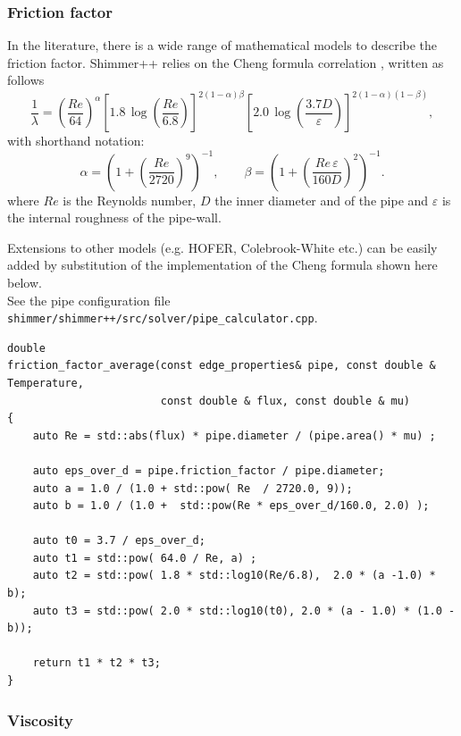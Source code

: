 \subsubsection{Friction factor}

In the literature, there is a wide range of mathematical models to describe the friction factor. Shimmer++ relies on the Cheng formula correlation \cite{CHENG}, written as follows
\begin{equation*}
\label{cheng}
\frac{1}{\lambda} =
\left( \frac{Re}{64} \right)^{\alpha}
\left[ 1.8 \, \log\!\left( \frac{Re}{6.8} \right) \right]^{2(1-\alpha)\beta}
\left[ 2.0 \, \log\!\left( \frac{3.7D}{\varepsilon} \right) \right]^{2(1-\alpha)(1-\beta)},
\end{equation*}
with shorthand notation:
\begin{equation*}
\alpha = \left(1 + \left( \dfrac{Re}{2720} \right)^{9}\right)^{-1},
\qquad
\beta = \left(1 + \left( \dfrac{Re \, \varepsilon}{160 D} \right)^{2}\right)^{-1}.
\label{eq:cheng_ab}
\end{equation*}
where $Re$ is the Reynolds number, $D$ the inner diameter and of the pipe and $\varepsilon$ is the internal roughness of the pipe-wall.

Extensions to other models (e.g. HOFER, Colebrook-White etc.) can be easily added by substitution of the implementation of the Cheng formula shown here below. \\
See the pipe configuration file 
\texttt{shimmer/shimmer++/src/solver/pipe\_calculator.cpp}.
\begin{verbatim}
double
friction_factor_average(const edge_properties& pipe, const double & Temperature,
                        const double & flux, const double & mu)
{
    auto Re = std::abs(flux) * pipe.diameter / (pipe.area() * mu) ; 

    auto eps_over_d = pipe.friction_factor / pipe.diameter;
    auto a = 1.0 / (1.0 + std::pow( Re  / 2720.0, 9));
    auto b = 1.0 / (1.0 +  std::pow(Re * eps_over_d/160.0, 2.0) );

    auto t0 = 3.7 / eps_over_d;
    auto t1 = std::pow( 64.0 / Re, a) ;
    auto t2 = std::pow( 1.8 * std::log10(Re/6.8),  2.0 * (a -1.0) * b);
    auto t3 = std::pow( 2.0 * std::log10(t0), 2.0 * (a - 1.0) * (1.0 - b));
        
    return t1 * t2 * t3; 
}
\end{verbatim} 

\subsubsection{Viscosity} \label{sec:viscosity}

